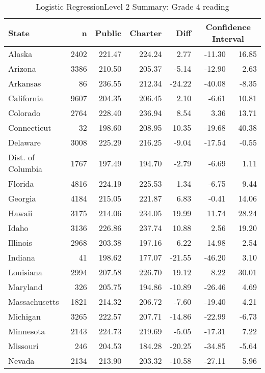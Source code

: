 \begin{table}[ht]
\begin{center}
\caption{Logistic RegressionLevel 2 Summary: Grade 4 reading}
\label{g4readinglrlevel2}
\begin{tabular}{lrrrrrr}
  \hline
  State & n & Public & Charter & Diff & \multicolumn{2}{c}{Confidence Interval} \\ \hline
Alaska & 2402 & 221.47 & 224.24 & 2.77 & -11.30 & 16.85 \\ 
  Arizona & 3386 & 210.50 & 205.37 & -5.14 & -12.90 & 2.63 \\ 
  Arkansas &  86 & 236.55 & 212.34 & -24.22 & -40.08 & -8.35 \\ 
  California & 9607 & 204.35 & 206.45 & 2.10 & -6.61 & 10.81 \\ 
  Colorado & 2764 & 228.40 & 236.94 & 8.54 & 3.36 & 13.71 \\ 
  Connecticut &  32 & 198.60 & 208.95 & 10.35 & -19.68 & 40.38 \\ 
  Delaware & 3008 & 225.29 & 216.25 & -9.04 & -17.54 & -0.55 \\ 
  Dist. of Columbia & 1767 & 197.49 & 194.70 & -2.79 & -6.69 & 1.11 \\ 
  Florida & 4816 & 224.19 & 225.53 & 1.34 & -6.75 & 9.44 \\ 
  Georgia & 4184 & 215.05 & 221.87 & 6.83 & -0.41 & 14.06 \\ 
  Hawaii & 3175 & 214.06 & 234.05 & 19.99 & 11.74 & 28.24 \\ 
  Idaho & 3136 & 226.86 & 237.74 & 10.88 & 2.56 & 19.20 \\ 
  Illinois & 2968 & 203.38 & 197.16 & -6.22 & -14.98 & 2.54 \\ 
  Indiana &  41 & 198.62 & 177.07 & -21.55 & -46.20 & 3.10 \\ 
  Louisiana & 2994 & 207.58 & 226.70 & 19.12 & 8.22 & 30.01 \\ 
  Maryland & 326 & 205.75 & 194.86 & -10.89 & -26.46 & 4.69 \\ 
  Massachusetts & 1821 & 214.32 & 206.72 & -7.60 & -19.40 & 4.21 \\ 
  Michigan & 3265 & 222.57 & 207.71 & -14.86 & -22.99 & -6.73 \\ 
  Minnesota & 2143 & 224.73 & 219.69 & -5.05 & -17.31 & 7.22 \\ 
  Missouri & 246 & 204.53 & 184.28 & -20.25 & -34.85 & -5.64 \\ 
  Nevada & 2134 & 213.90 & 203.32 & -10.58 & -27.11 & 5.96 \\ 

\end{tabular}
\end{center}
\end{table}
